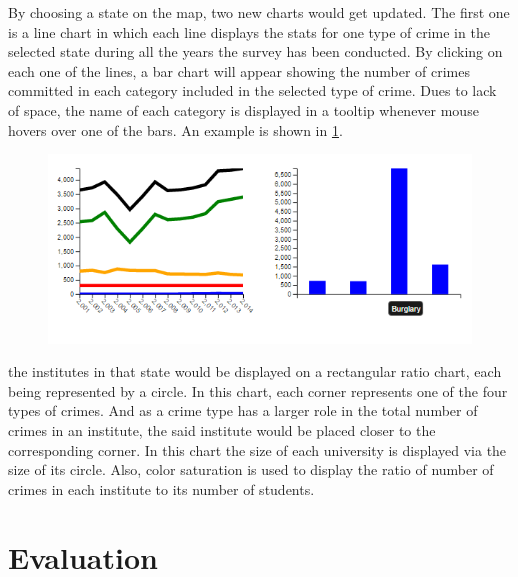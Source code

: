 \documentclass[12pt]{article}
\begin{document}
By choosing a state on the map, two new charts would get updated. The first one is a line chart in which each line displays the stats for one type of crime in the selected state during all the years the survey has been conducted. By clicking on each one of the lines, a bar chart will appear showing the number of crimes committed in each category included in the selected type of crime. Dues to lack of space, the name of each category is displayed in a tooltip whenever mouse hovers over one of the bars. An example is shown in \cref{fig:charts}.
\begin{figure}[H]
   \centering{}
	       \includegraphics[width=5in]{chart.PNG}           
\caption{}
\label{fig:charts}
\end{figure}

the institutes in that state would be displayed on a rectangular ratio chart, each being represented by a circle. In this chart, each corner represents one of the four types of crimes. And as a crime type has a larger role in the total number of crimes in an institute, the said institute would be placed closer to the corresponding corner. In this chart the size of each university is displayed via the size of its circle. Also, color saturation is used to display the ratio of number of crimes in each institute to its number of students.


\section{Evaluation}



 

\end{document}
